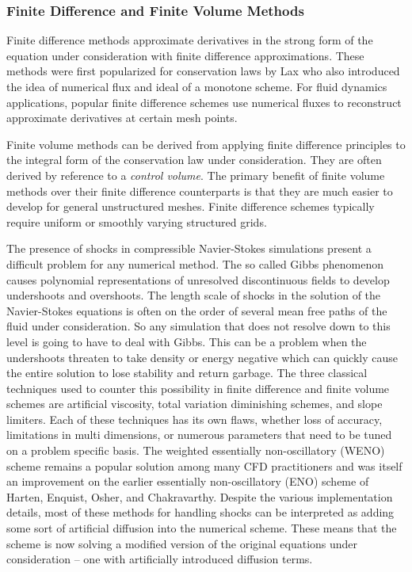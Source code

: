 \documentclass[Proposal.tex]{subfiles}
\begin{document}
\subsubsection{Finite Difference and Finite Volume Methods}
Finite difference methods approximate derivatives in the strong form of the equation under consideration with finite difference approximations.
These methods were first popularized for conservation laws by Lax who also introduced the idea of numerical flux and ideal of a monotone scheme.
For fluid dynamics applications, popular finite difference schemes use numerical fluxes to reconstruct approximate derivatives at certain mesh points.

Finite volume methods can be derived from applying finite difference principles to the integral form of the conservation law under consideration.
They are often derived by reference to a \emph{control volume}. 
The primary benefit of finite volume methods over their finite difference counterparts is that they are much easier to develop for general unstructured meshes.
Finite difference schemes typically require uniform or smoothly varying structured grids.

The presence of shocks in compressible Navier-Stokes simulations present a difficult problem for any numerical method.
The so called Gibbs phenomenon causes polynomial representations of unresolved discontinuous fields to develop undershoots and overshoots.
The length scale of shocks in the solution of the Navier-Stokes equations is often on the order of several mean free paths of the fluid under consideration.
So any simulation that does not resolve down to this level is going to have to deal with Gibbs.
This can be a problem when the undershoots threaten to take density or energy negative which can quickly cause the entire solution to
lose stability and return garbage.
The three classical techniques used to counter this possibility in finite difference and finite volume schemes are artificial viscosity, 
total variation diminishing schemes, and slope limiters.
Each of these techniques has its own flaws, whether loss of accuracy, limitations in multi dimensions, or numerous parameters that need 
to be tuned on a problem specific basis.
The weighted essentially non-oscillatory (WENO) scheme\cite{WENO} remains a popular solution among many CFD practitioners and was itself an improvement
on the earlier essentially non-oscillatory (ENO) scheme of Harten, Enquist, Osher, and Chakravarthy\cite{ENO}.
Despite the various implementation details, most of these methods for handling shocks can be interpreted as adding some sort of artificial diffusion
into the numerical scheme.
These means that the scheme is now solving a modified version of the original equations under consideration 
-- one with artificially introduced diffusion terms.
\end{document}
